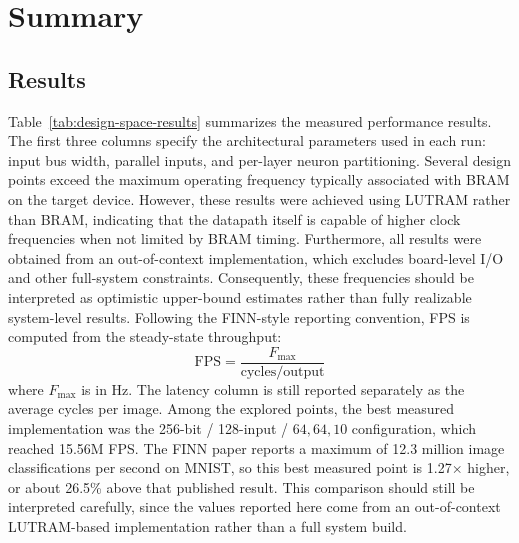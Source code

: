 \section{Summary}

\subsection{Results}

Table~\ref{tab:design-space-results} summarizes the measured performance results.
The first three columns specify the architectural parameters used in each run:
input bus width, parallel inputs, and per-layer neuron
partitioning. Several design points exceed the maximum operating frequency
typically associated with BRAM on the target device. However, these results
were achieved using LUTRAM rather than BRAM, indicating that the datapath
itself is capable of higher clock frequencies when not limited by BRAM timing.
Furthermore, all results were obtained from an out-of-context implementation,
which excludes board-level I/O and other full-system constraints.
Consequently, these frequencies should be interpreted as optimistic upper-bound
estimates rather than fully realizable system-level results. Following the
FINN-style reporting convention, FPS is computed from the steady-state
throughput:
\[
\mathrm{FPS} = \frac{F_{\max}}{\text{cycles/output}}
\]
where \(F_{\max}\) is in Hz. The latency column is still reported separately as
the average cycles per image. Among the explored points, the best measured
implementation was the 256-bit / 128-input / \(64,64,10\) configuration,
which reached 15.56M FPS. The FINN paper reports a maximum of 12.3 million
image classifications per second on MNIST, so this best measured point is
1.27\(\times\) higher, or about 26.5\% above that published result. This
comparison should still be interpreted carefully, since the values reported
here come from an out-of-context LUTRAM-based implementation rather than a
full system build.

\begin{strip}
  \centering
  \label{tab:design-space-results}
\end{strip}

